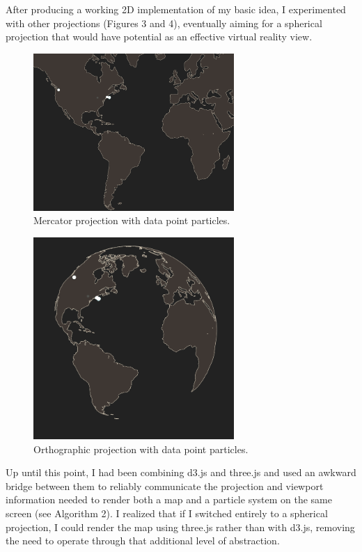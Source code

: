 \documentclass[conference]{acmsiggraph}
\begin{document}
After producing a working 2D implementation of my basic idea, I experimented
with other projections (Figures 3 and 4), eventually aiming for a spherical
projection that would have potential as an effective virtual reality view.

\begin{figure}
  \centering
  \includegraphics[width=3.0in]{images/mercator_projection_with_particles}
  \caption{Mercator projection with data point particles.}
\end{figure}

\begin{figure}
  \centering
  \includegraphics[width=3.0in]{images/orthographic_projection_with_particles}
  \caption{Orthographic projection with data point particles.}
\end{figure}

Up until this point, I had been combining d3.js and three.js and used an awkward
bridge between them to reliably communicate the projection and viewport
information needed to render both a map and a particle system on the same
screen (see Algorithm 2). I realized that if I switched entirely to a spherical
projection, I could render the map using three.js rather than with d3.js,
removing the need to operate through that additional level of abstraction.
\end{document}
